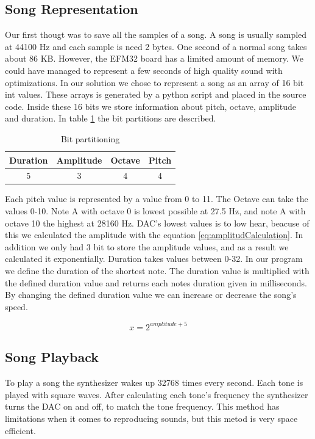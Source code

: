 \subsection{Song Representation}
Our first thougt was to save all the samples of a song. A song is usually sampled at 44100 Hz and each sample is need 2 bytes. One second of a normal song takes about 86 KB. However, the EFM32 board has a limited amount of memory. We could have managed to represent a few seconds of high quality sound with optimizations. In our solution we chose to represent a song as an array of 16 bit int values. These arrays is generated by a python script and placed in the source code. Inside these 16 bits we store information about pitch, octave, amplitude and duration. In table \ref{tab:bitFields} the bit partitions are described.

\begin{table}[H]
	\begin{center}
	\begin{tabular}{ |c|c|c|c| }
	  \hline
	  Duration & Amplitude & Octave & Pitch \\
	  \hline
	  5 & 3 & 4 & 4 \\
	  \hline

	\end{tabular}
	\caption{Bit partitioning}
	\label{tab:bitFields}
	\end{center}
\end{table}

Each pitch value is represented by a value from 0 to 11. The Octave can take the values 0-10. Note A with octave 0 is lowest possible at 27.5 Hz, and note A with octave 10 the highest at 28160 Hz. DAC's lowest values is to low hear, beacuse of this we calculated the amplitude with the equation \ref{eq:amplitudCalculation}. In addition we only had 3 bit to store the amplitude values, and as a result we calculated it exponentially. Duration takes values between 0-32. In our program we define the duration of the shortest note. The duration value is multiplied with the defined duration value and returns each notes duration given in milliseconds. By changing the defined duration value we can increase or decrease the song's speed.

\begin{equation}
  x = 2^{amplitude + 5}
  \label{eq:amplitudCalculation}
\end{equation}

\subsection{Song Playback}
To play a song the synthesizer wakes up 32768 times every second. Each tone is played with square waves. After calculating each tone's frequency the synthesizer turns the DAC on and off, to match the tone frequency. This method has limitations when it comes to reproducing sounds, but this metod is very space efficient.

